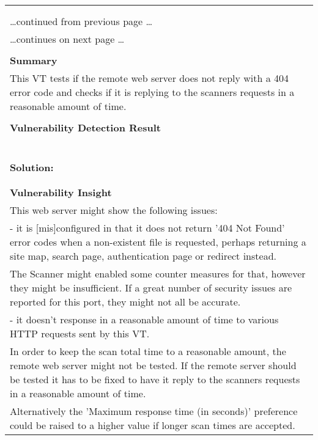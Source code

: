 \documentclass{article}
\begin{document}
\begin{longtable}{|p{}|}
\hline
\rowcolor{gvm_log}{\color{white}{Log (CVSS: 0.0) }}\\
\rowcolor{gvm_log}{\color{white}{NVT: Response Time / No 404 Error Code Check}}\\
\hline
\endfirsthead
\hfill\ldots continued from previous page \ldots \\
\hline
\endhead
\hline
\ldots continues on next page \ldots \\
\endfoot
\hline
\endlastfoot
\\
\textbf{Summary}\\
This VT tests if the remote web server does not reply with a 404
  error code and checks if it is replying to the scanners requests in a reasonable amount of time.\\

        \hline
        \\
\textbf{Vulnerability Detection Result}\\
\rowcolor{white}{\verb=The service is responding with a 200 HTTP status code to non-existent files/urls=}\\
\rowcolor{white}{$\hookrightarrow$\verb=. The following pattern is used to work around possible false detections:=}\\
\rowcolor{white}{\verb=-----=}\\
\rowcolor{white}{\verb=TYPE=\verb-=-\verb="password"=}\\
\rowcolor{white}{\verb=-----=}\\

          \hline
          \\
\textbf{Solution:}\\
\\

          \hline
          \\
\textbf{Vulnerability Insight}\\
This web server might show the following issues:\\
  - it is [mis]configured in that it does not return '404 Not Found' error codes when a non-existent
  file is requested, perhaps returning a site map, search page, authentication page or redirect instead.\\
  The Scanner might enabled some counter measures for that, however they might be insufficient. If a
  great number of security issues are reported for this port, they might not all be accurate.\\
  - it doesn't response in a reasonable amount of time to various HTTP requests sent by this VT.\\
  In order to keep the scan total time to a reasonable amount, the remote web server might not be
  tested. If the remote server should be tested it has to be fixed to have it reply to the scanners
  requests in a reasonable amount of time.\\
  Alternatively the 'Maximum response time (in seconds)' preference could be raised to a higher
  value if longer scan times are accepted.\\



\end{longtable}
\end{document}
